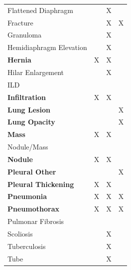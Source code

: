 \documentclass[review,1p,times,numbers]{elsarticle}
\begin{document}
\begin{table}[htbp]
\begin{tabular}{lccc}
        Flattened Diaphragm       &   & X &   \\
        Fracture                  &   & X & X \\
        Granuloma                 &   & X &   \\
        Hemidiaphragm Elevation   &   & X &   \\
        \textbf{Hernia}           & X & X &   \\
        Hilar Enlargement         &   & X &   \\
        ILD                       &   &   &   \\
        \cellcolor{table_row_highlight}\textbf{Infiltration} &
        \cellcolor{table_row_highlight} X &
        \cellcolor{table_row_highlight} X &
        \cellcolor{table_row_highlight} \\
        \cellcolor{table_row_highlight}\textbf{Lung Lesion} &
        \cellcolor{table_row_highlight} &
        \cellcolor{table_row_highlight} &
        \cellcolor{table_row_highlight} X \\
        \cellcolor{table_row_highlight}\textbf{Lung Opacity} &
        \cellcolor{table_row_highlight} &
        \cellcolor{table_row_highlight} &
        \cellcolor{table_row_highlight} X \\
        \textbf{Mass}               & X & X &   \\
        Nodule/Mass                 &   &   &   \\
        \textbf{Nodule}             & X & X &   \\
        \textbf{Pleural Other}      &   &   & X \\
        \textbf{Pleural Thickening} & X & X &   \\
        \cellcolor{table_row_highlight}\textbf{Pneumonia} &
        \cellcolor{table_row_highlight} X         &
        \cellcolor{table_row_highlight} X         &
        \cellcolor{table_row_highlight} X         \\
        \textbf{Pneumothorax}      & X & X & X \\
        Pulmonar Fibrosis          &   &   &   \\
        Scoliosis                  &   & X &   \\
        Tuberculosis               &   & X &   \\
        Tube                       &   & X &   \\
    \end{tabular}
\end{table}
\end{document}
